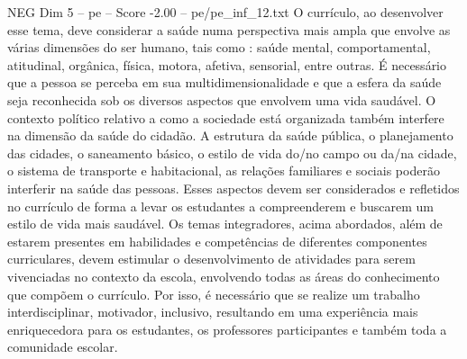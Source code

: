 \begin{textsample}{NEG Dim 5 – pe – Score -2.00 – pe/pe\_inf\_12.txt}
O currículo, ao desenvolver esse tema, deve considerar a saúde numa perspectiva mais ampla que envolve as várias dimensões do ser humano, tais como : saúde mental, comportamental, atitudinal, orgânica, física, motora, afetiva, sensorial, entre outras.
É necessário que a pessoa se perceba em sua multidimensionalidade e que a esfera da saúde seja reconhecida sob os diversos aspectos que envolvem uma vida saudável.
O contexto político relativo a como a sociedade está organizada também interfere na dimensão da saúde do cidadão.
A estrutura da saúde pública, o planejamento das cidades, o saneamento básico, o estilo de vida do/no campo ou da/na cidade, o sistema de transporte e habitacional, as relações familiares e sociais poderão interferir na saúde das pessoas.
Esses aspectos devem ser considerados e refletidos no currículo de forma a levar os estudantes a compreenderem e buscarem um estilo de vida mais saudável.
Os temas integradores, acima abordados, além de estarem presentes em habilidades e competências de diferentes componentes curriculares, devem estimular o desenvolvimento de atividades para serem vivenciadas no contexto da escola, envolvendo todas as áreas do conhecimento que compõem o currículo.
Por isso, é necessário que se realize um trabalho interdisciplinar, motivador, inclusivo, resultando em uma experiência mais enriquecedora para os estudantes, os professores participantes e também toda a comunidade escolar.

\end{textsample}
